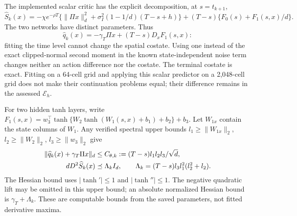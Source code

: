 The implemented scalar critic has the explicit decomposition, at
$s=t_{k+1}$,
\begin{equation}
 \widehat S_k(x)=-\chi e^{-\rho T}
     \{\|\Pi x\|_d^2+\sigma_I^2(1-1/d)(T-s+h)\}
       +(T-s)\{F_0(s)+F_1(s,x)/d\}.
 \label{eq:r15criticform}
\end{equation}
The two networks have distinct parameters. Thus
\[
\widehat q_k(x)=-\gamma_T\Pi x+(T-s)D_xF_1(s,x):
\]
fitting the time level cannot change the spatial costate. Using one
instead of the exact clipped-normal second moment in the known
state-independent noise term changes neither an action difference nor
the costate. The terminal costate is exact. Fitting on a 64-cell grid
and applying this scalar predictor on a 2,048-cell grid does not make
their continuation problems equal; their difference remains in the
assessed $\mathcal E_h$.

For two hidden tanh layers, write
$F_1(s,x)=w_3^\top\tanh\{W_2\tanh(W_1(s,x)+b_1)+b_2\}+b_3$.
Let $W_{1x}$ contain the state columns of $W_1$. Any verified spectral
upper bounds $l_1\geq\|W_{1x}\|_2$,
$l_2\geq\|W_2\|_2$, $l_3\geq\|w_3\|_2$ give
\begin{align}
 \|\widehat q_k(x)+\gamma_T\Pi x\|_d
       &\leq C_{\theta,k}:=(T-s)l_1l_2l_3/\sqrt d,\notag\\
 dD^2\widehat S_k(x)&\preceq\Lambda_k I_d,
       \qquad \Lambda_k=(T-s)l_3l_1^2(l_2^2+l_2).
 \label{eq:r15networkbounds}
\end{align}
The Hessian bound uses $|\tanh'|\leq1$ and $|\tanh''|\leq1$.
The negative quadratic lift may be omitted in this upper bound; an
absolute normalized Hessian bound is $\gamma_T+\Lambda_k$.
These are computable bounds from the saved parameters, not fitted
derivative maxima.


